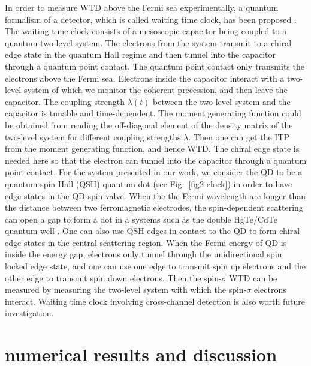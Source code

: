 \documentclass[aps,prb,twocolumn,footinbib,showpacs,superscriptaddress,preprintnumbers,amsmath,amssymb]{revtex4-1}
\begin{document}
In order to measure WTD above the Fermi sea experimentally, a quantum formalism of a detector, which is called waiting time clock, has been proposed \cite{WTD_clock}. 
The waiting time clock consists of a mesoscopic capacitor being coupled to a quantum two-level system. The electrons from the system transmit to a chiral edge state in the quantum Hall regime and then tunnel into the capacitor through a quantum point contact. The quantum point contact only transmits the electrons above the Fermi sea. Electrons inside the capacitor interact with a two-level system of which we monitor the coherent precession, and then leave the capacitor. The coupling strength $\lambda(t)$ between the two-level system and the capacitor is tunable and time-dependent. The moment generating function could be obtained from reading the off-diagonal element of the density matrix of the two-level system for different coupling strengths $\lambda$. Then one can get the ITP from the moment generating function, and hence WTD. The chiral edge state is needed here so that the electron can tunnel into the capacitor through a quantum point contact. For the system presented in our work, we consider the QD to be a quantum spin Hall (QSH) quantum dot \cite{QSH_QD1, QSH_QD2, QSH_QD3} (see Fig.~\ref{fig2-clock}) in order to have edge states in the QD spin valve. 
When the the Fermi wavelength are longer than the distance between two ferromagnetic electrodes, the spin-dependent scattering can open a gap to form a dot in a systems such as the double HgTe/CdTe quantum well \cite{double-QWs}. 
One can also use QSH edges in contact to the QD \cite{QSH_QD4, QSH_QD5} to form chiral edge states in the central scattering region. When the Fermi energy of QD is inside the energy gap, electrons only tunnel through the unidirectional spin locked edge state, and one can use one edge to transmit spin up electrons and the other edge to transmit spin down electrons. Then the spin-$\sigma$ WTD can be measured by measuring the two-level system with which the spin-$\sigma$ electrons interact. Waiting time clock involving cross-channel detection is also worth future investigation. 


\section{numerical results and discussion} \label{sec3}

\end{document}
